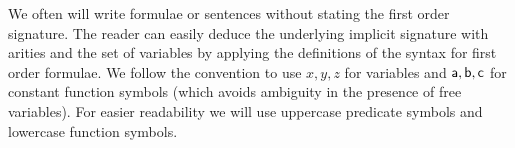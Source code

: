 	We often will write formulae or sentences 
	without stating the first order signature.
The reader can easily deduce the underlying {\myem implicit} signature with arities 
and the set of variables by applying the definitions of the syntax for first order formulae.
We follow the convention to use $x,y,z$ for variables 
and ${\mathsf a},{\mathsf b},{\mathsf c}$ for constant function symbols 
(which avoids ambiguity in the presence of free variables). 
For easier readability we will use uppercase predicate symbols and lowercase function symbols.
